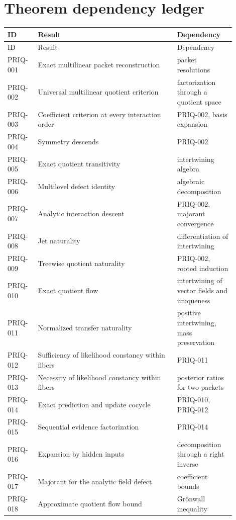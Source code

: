 \documentclass[11pt]{article}
\theoremstyle{definition}
\theoremstyle{remark}
\begin{document}
\section{Theorem dependency ledger}\label{app:ledger}

\begin{longtable}{@{}p{0.12\linewidth}p{0.55\linewidth}p{0.23\linewidth}@{}}
\toprule
ID & Result & Dependency\\
\midrule
\endfirsthead
\toprule
ID & Result & Dependency\\
\midrule
\endhead
PRIQ-001 & Exact multilinear packet reconstruction & packet resolutions\\
PRIQ-002 & Universal multilinear quotient criterion & factorization through a quotient space\\
PRIQ-003 & Coefficient criterion at every interaction order & PRIQ-002, basis expansion\\
PRIQ-004 & Symmetry descends & PRIQ-002\\
PRIQ-005 & Exact quotient transitivity & intertwining algebra\\
PRIQ-006 & Multilevel defect identity & algebraic decomposition\\
PRIQ-007 & Analytic interaction descent & PRIQ-002, majorant convergence\\
PRIQ-008 & Jet naturality & differentiation of intertwining\\
PRIQ-009 & Treewise quotient naturality & PRIQ-002, rooted induction\\
PRIQ-010 & Exact quotient flow & intertwining of vector fields and uniqueness\\
PRIQ-011 & Normalized transfer naturality & positive intertwining, mass preservation\\
PRIQ-012 & Sufficiency of likelihood constancy within fibers & PRIQ-011\\
PRIQ-013 & Necessity of likelihood constancy within fibers & posterior ratios for two packets\\
PRIQ-014 & Exact prediction and update cocycle & PRIQ-010, PRIQ-012\\
PRIQ-015 & Sequential evidence factorization & PRIQ-014\\
PRIQ-016 & Expansion by hidden inputs & decomposition through a right inverse\\
PRIQ-017 & Majorant for the analytic field defect & coefficient bounds\\
PRIQ-018 & Approximate quotient flow bound & Grönwall inequality\\

\end{longtable}
\end{document}
